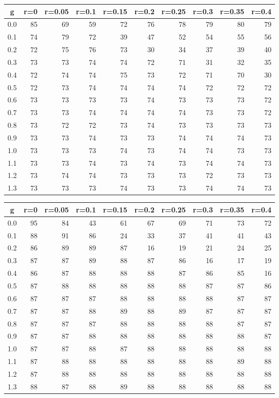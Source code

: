 %
\begin{table}[!tbp]
 \begin{center}
 \begin{tabular}{rrrrrrrrrr}\hline\hline
\multicolumn{1}{c}{g}&\multicolumn{1}{c}{r=0}&\multicolumn{1}{c}{r=0.05}&\multicolumn{1}{c}{r=0.1}&\multicolumn{1}{c}{r=0.15}&\multicolumn{1}{c}{r=0.2}&\multicolumn{1}{c}{r=0.25}&\multicolumn{1}{c}{r=0.3}&\multicolumn{1}{c}{r=0.35}&\multicolumn{1}{c}{r=0.4}\tabularnewline
\hline
0.0&85&69&59&72&76&78&79&80&79\tabularnewline
0.1&74&79&72&39&47&52&54&55&56\tabularnewline
0.2&72&75&76&73&30&34&37&39&40\tabularnewline
0.3&73&73&74&74&72&71&31&32&35\tabularnewline
0.4&72&74&74&75&73&72&71&70&30\tabularnewline
0.5&72&73&74&74&74&74&72&72&72\tabularnewline
0.6&73&73&73&73&74&73&73&73&72\tabularnewline
0.7&73&73&74&74&74&74&73&73&72\tabularnewline
0.8&73&72&72&73&74&73&73&73&73\tabularnewline
0.9&73&73&74&73&73&74&74&74&73\tabularnewline
1.0&73&73&73&74&73&74&74&73&73\tabularnewline
1.1&73&73&74&73&74&73&74&74&73\tabularnewline
1.2&73&74&74&73&73&73&72&73&73\tabularnewline
1.3&73&73&73&74&73&73&74&74&73\tabularnewline
\hline
\end{tabular}

\end{center}

\end{table}

%
\begin{table}[!tbp]
 \begin{center}
 \begin{tabular}{rrrrrrrrrr}\hline\hline
\multicolumn{1}{c}{g}&\multicolumn{1}{c}{r=0}&\multicolumn{1}{c}{r=0.05}&\multicolumn{1}{c}{r=0.1}&\multicolumn{1}{c}{r=0.15}&\multicolumn{1}{c}{r=0.2}&\multicolumn{1}{c}{r=0.25}&\multicolumn{1}{c}{r=0.3}&\multicolumn{1}{c}{r=0.35}&\multicolumn{1}{c}{r=0.4}\tabularnewline
\hline
0.0&95&84&43&61&67&69&71&73&72\tabularnewline
0.1&88&91&86&24&33&37&41&41&43\tabularnewline
0.2&86&89&89&87&16&19&21&24&25\tabularnewline
0.3&87&87&89&88&87&86&16&17&19\tabularnewline
0.4&86&87&88&88&88&87&86&85&16\tabularnewline
0.5&87&88&88&88&88&88&87&87&86\tabularnewline
0.6&87&87&87&88&88&88&88&87&87\tabularnewline
0.7&87&87&88&89&88&89&87&87&87\tabularnewline
0.8&87&87&87&88&88&88&88&87&87\tabularnewline
0.9&87&87&88&88&88&88&88&88&87\tabularnewline
1.0&87&87&88&87&88&88&88&88&88\tabularnewline
1.1&87&88&88&88&88&88&88&89&88\tabularnewline
1.2&87&88&88&88&88&88&88&88&88\tabularnewline
1.3&88&87&88&89&88&88&88&88&88\tabularnewline
\hline
\end{tabular}

\end{center}

\end{table}

